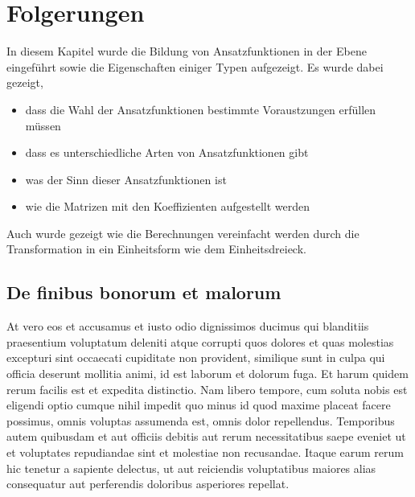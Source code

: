 %
%
%
\section{Folgerungen
\label{fem:section:folgerungen}}
In diesem Kapitel wurde die Bildung von Ansatzfunktionen in der Ebene eingeführt sowie die Eigenschaften einiger Typen aufgezeigt. Es wurde dabei gezeigt,
\begin{itemize}
	\item dass die Wahl der Ansatzfunktionen bestimmte Voraustzungen erfüllen müssen
	\item dass es unterschiedliche Arten von Ansatzfunktionen gibt
	\item was der Sinn dieser Ansatzfunktionen ist
	\item wie die Matrizen mit den Koeffizienten aufgestellt werden
\end{itemize}
Auch wurde gezeigt wie die Berechnungen vereinfacht werden durch die Transformation in ein Einheitsform wie dem Einheitsdreieck. 


\subsection{De finibus bonorum et malorum
\label{fem:subsection:malorum}}
At vero eos et accusamus et iusto odio dignissimos ducimus qui
blanditiis praesentium voluptatum deleniti atque corrupti quos
dolores et quas molestias excepturi sint occaecati cupiditate non
provident, similique sunt in culpa qui officia deserunt mollitia
animi, id est laborum et dolorum fuga. Et harum quidem rerum facilis
est et expedita distinctio. Nam libero tempore, cum soluta nobis
est eligendi optio cumque nihil impedit quo minus id quod maxime
placeat facere possimus, omnis voluptas assumenda est, omnis dolor
repellendus. Temporibus autem quibusdam et aut officiis debitis aut
rerum necessitatibus saepe eveniet ut et voluptates repudiandae
sint et molestiae non recusandae. Itaque earum rerum hic tenetur a
sapiente delectus, ut aut reiciendis voluptatibus maiores alias
consequatur aut perferendis doloribus asperiores repellat.


